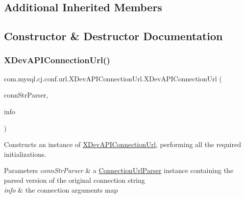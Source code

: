 \subsection*{Additional Inherited Members}


\subsection{Constructor \& Destructor Documentation}
\mbox{\label{classcom_1_1mysql_1_1cj_1_1conf_1_1url_1_1_x_dev_a_p_i_connection_url_a81df74119f400043949eb96ebec792e0}} 
\subsubsection{\texorpdfstring{X\+Dev\+A\+P\+I\+Connection\+Url()}{XDevAPIConnectionUrl()}}
{\footnotesize\ttfamily com.\+mysql.\+cj.\+conf.\+url.\+X\+Dev\+A\+P\+I\+Connection\+Url.\+X\+Dev\+A\+P\+I\+Connection\+Url (\begin{DoxyParamCaption}\item[{\mbox{\hyperlink{classcom_1_1mysql_1_1cj_1_1conf_1_1_connection_url_parser}{Connection\+Url\+Parser}}}]{conn\+Str\+Parser,  }\item[{Properties}]{info }\end{DoxyParamCaption})}

Constructs an instance of \mbox{\hyperlink{classcom_1_1mysql_1_1cj_1_1conf_1_1url_1_1_x_dev_a_p_i_connection_url}{X\+Dev\+A\+P\+I\+Connection\+Url}}, performing all the required initializations.


\begin{DoxyParams}{Parameters}
{\em conn\+Str\+Parser} & a \mbox{\hyperlink{classcom_1_1mysql_1_1cj_1_1conf_1_1_connection_url_parser}{Connection\+Url\+Parser}} instance containing the parsed version of the original connection string \\
\hline
{\em info} & the connection arguments map \\
\hline
\end{DoxyParams}


